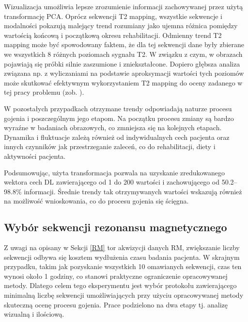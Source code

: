 Wizualizacja umożliwia lepsze zrozumienie informacji zachowywanej przez użytą transformację PCA. Oprócz sekwencji T2 mapping, wszystkie sekwencje i modalności pokazują malejący trend rozumiany jako ujemna różnica pomiędzy wartością końcową i początkową okresu rehabilitacji. Odmienny trend T2 mapping może być spowodowany faktem, że dla tej sekwencji dane były zbierane we wszystkich 8 różnych poziomach sygnału T2. W związku z czym, w obrazach pojawiają się próbki silnie zaszumione i zniekształcone. Dopiero głębsza analiza związana np. z wyliczaniami na podstawie aproksymacji wartości tych poziomów może skutkować efektywnym wykorzystaniem T2 mapping do oceny zadanego w tej pracy problemu (zob. \cite{Regulski2017}). 

W pozostałych przypadkach otrzymane trendy odpowiadają naturze procesu gojenia i poszczególnym jego etapom. Na początku procesu zmiany są bardzo wyraźne w badaniach obrazowych, co zmniejsza się na kolejnych etapach. Dynamika i fluktuacje zależą również od indywidualnych cech pacjenta oraz innych czynników jak przestrzeganie zaleceń, co do rehabilitacji, diety i aktywności pacjenta. 

Podsumowując, użyta transformacja pozwala na uzyskanie zredukowanego wektora cech DL zawierającego od 1 do 200 wartości i zachowującego od 50.2--98.8\% informacji. Średnie trendy tak otrzymywanych wartości wskazują również na możliwość wnioskowania, co do procesu gojenia się ścięgna.  


\subsection{Wybór sekwencji rezonansu magnetycznego}
\label{seq:protocol_selection}
Z uwagi na opisany w Sekcji \ref{RM} tor akwizycji danych RM, zwiększanie liczby sekwencji odbywa się kosztem wydłużenia czasu badania pacjenta. W skrajnym przypadku, takim jak pozyskanie wszystkich 10 omawianych sekwencji, czas ten wynosi około 1 godziny, co stanowi praktyczne ograniczenie opracowywanej metody. Dlatego celem tego eksperymentu jest wybór protokołu zawierającego minimalną liczbę sekwencji umożliwiających przy użyciu opracowywanej metody skuteczną ocenę procesu gojenia. Prace podzielono na dwa etapy tj. analizę wizualną i ilościową.

